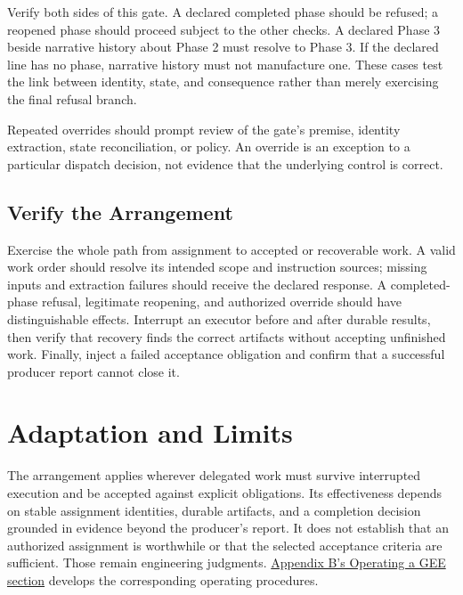 Verify both sides of this gate. A declared completed phase should be refused; a reopened phase should proceed subject to the other checks. A declared Phase 3 beside narrative history about Phase 2 must resolve to Phase 3. If the declared line has no phase, narrative history must not manufacture one. These cases test the link between identity, state, and consequence rather than merely exercising the final refusal branch.

Repeated overrides should prompt review of the gate's premise, identity extraction, state reconciliation, or policy. An override is an exception to a particular dispatch decision, not evidence that the underlying control is correct.

\subsection*{Verify the Arrangement}

Exercise the whole path from assignment to accepted or recoverable work. A valid work order should resolve its intended scope and instruction sources; missing inputs and extraction failures should receive the declared response. A completed-phase refusal, legitimate reopening, and authorized override should have distinguishable effects. Interrupt an executor before and after durable results, then verify that recovery finds the correct artifacts without accepting unfinished work. Finally, inject a failed acceptance obligation and confirm that a successful producer report cannot close it.

\section{Adaptation and Limits}

The arrangement applies wherever delegated work must survive interrupted execution and be accepted against explicit obligations. Its effectiveness depends on stable assignment identities, durable artifacts, and a completion decision grounded in evidence beyond the producer's report. It does not establish that an authorized assignment is worthwhile or that the selected acceptance criteria are sufficient. Those remain engineering judgments. \href{appendix-b-operating-a-gee.html}{Appendix B's Operating a GEE section} develops the corresponding operating procedures.
